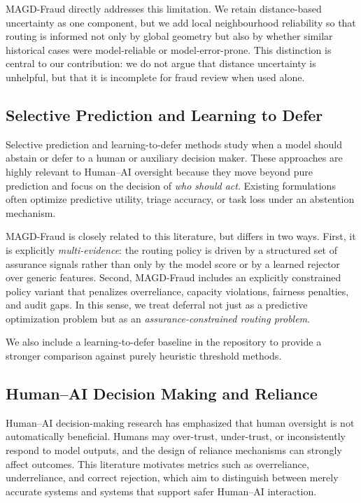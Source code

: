 MAGD-Fraud directly addresses this limitation. We retain distance-based uncertainty as one component, but we add local neighbourhood reliability so that routing is informed not only by global geometry but also by whether similar historical cases were model-reliable or model-error-prone. This distinction is central to our contribution: we do not argue that distance uncertainty is unhelpful, but that it is incomplete for fraud review when used alone.

\subsection{Selective Prediction and Learning to Defer}
\label{subsec:rw_deferral}

Selective prediction and learning-to-defer methods study when a model should abstain or defer to a human or auxiliary decision maker. These approaches are highly relevant to Human--AI oversight because they move beyond pure prediction and focus on the decision of \emph{who should act}. Existing formulations often optimize predictive utility, triage accuracy, or task loss under an abstention mechanism.

MAGD-Fraud is closely related to this literature, but differs in two ways. First, it is explicitly \emph{multi-evidence}: the routing policy is driven by a structured set of assurance signals rather than only by the model score or by a learned rejector over generic features. Second, MAGD-Fraud includes an explicitly constrained policy variant that penalizes overreliance, capacity violations, fairness penalties, and audit gaps. In this sense, we treat deferral not just as a predictive optimization problem but as an \emph{assurance-constrained routing problem}.

We also include a learning-to-defer baseline in the repository to provide a stronger comparison against purely heuristic threshold methods.

\subsection{Human--AI Decision Making and Reliance}
\label{subsec:rw_reliance}

Human--AI decision-making research has emphasized that human oversight is not automatically beneficial. Humans may over-trust, under-trust, or inconsistently respond to model outputs, and the design of reliance mechanisms can strongly affect outcomes. This literature motivates metrics such as overreliance, underreliance, and correct rejection, which aim to distinguish between merely accurate systems and systems that support safer Human--AI interaction.

